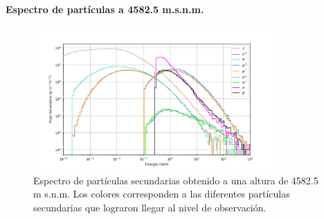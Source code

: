     \begin{frame}{} %
        \justifying %
        \vspace*{-0.4cm} %

        \begin{tcolorbox}[colback=custombgcolor2, coltext=customfgcolor2,
                      colframe=custombgcolor2, %
                      width=\textwidth,       %
                      boxrule=1pt,            %
                      top=0.1mm, bottom=0.1mm,     %
                      sharp corners=all,     %
                      halign=center,         %
                      valign=center,         %
                      ]
            \textbf{Espectro de partículas a 4582.5 m.s.n.m.}        
        \end{tcolorbox}
        \vspace*{-0.4cm} %
        
        \begin{figure}
            \centering
            \includegraphics[width=0.82\textwidth]{Figures/Thesis_flux_new2_4600msnm_without_title.png}
            \caption{\tiny Espectro de partículas secundarias obtenido a una altura de 4582.5 m s.n.m. Los colores corresponden a las diferentes partículas secundarias que lograron llegar al nivel de observación.}
        \end{figure}
    \end{frame}

